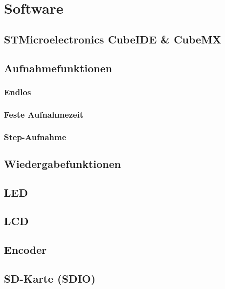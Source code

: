 
\newpage
\section{Software}
\subsection{STMicroelectronics CubeIDE \& CubeMX}
\subsection{Aufnahmefunktionen}
\subsubsection{Endlos}
\subsubsection{Feste Aufnahmezeit}
\subsubsection{Step-Aufnahme}
\subsection{Wiedergabefunktionen}
\subsection{LED}
\subsection{LCD}
\subsection{Encoder}
\subsection{SD-Karte (SDIO)}